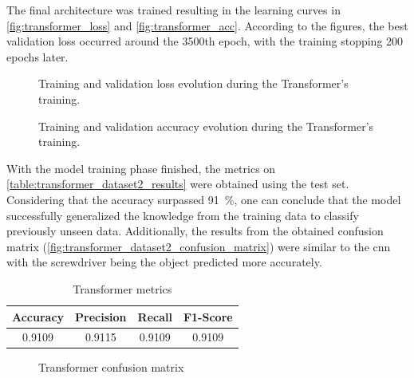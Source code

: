 The final architecture was trained resulting in the learning curves in \autoref{fig:transformer_loss} and \autoref{fig:transformer_acc}. According to the figures, the best validation loss occurred around the 3500th epoch, with the training stopping 200 epochs later.

\begin{figure}[ht]
    \centering
    {\fontsize{9.5}{12}\selectfont}
    \caption{Training and validation loss evolution during the Transformer's training.}
    \label{fig:transformer_loss}
\end{figure}

\begin{figure}[ht]
    \centering
    {\fontsize{9.5}{12}\selectfont}
    \caption{Training and validation accuracy evolution during the Transformer's training.}
    \label{fig:transformer_acc}
\end{figure}

With the model training phase finished, the metrics on \autoref{table:transformer_dataset2_results} were obtained using the test set. Considering that the accuracy surpassed \SI{91}{\percent}, one can conclude that the model successfully generalized the knowledge from the training data to classify previously unseen data. Additionally, the results from the obtained confusion matrix (\autoref{fig:transformer_dataset2_confusion_matrix}) were similar to the \acs{cnn} with the screwdriver being the object predicted more accurately.

\begin{table}[ht]
    \centering
    \caption{Transformer metrics}
    \label{table:transformer_dataset2_results}
    \begin{tabular}{cccc}
        \toprule
        Accuracy & Precision & Recall & F1-Score \\
        \midrule
        0.9109 & 0.9115 & 0.9109 & 0.9109 \\
        \bottomrule
    \end{tabular}
\end{table}

\begin{figure}[ht]
    \centering
    {\fontsize{10}{12}\selectfont}
    \caption{Transformer confusion matrix}
    \label{fig:transformer_dataset2_confusion_matrix}
\end{figure}

